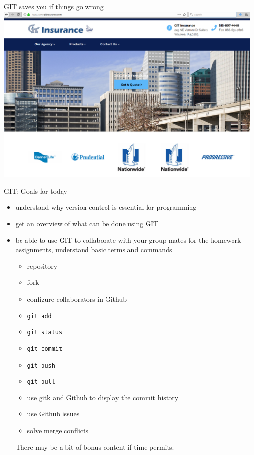 \begin{frame}[fragile]{GIT saves you if things go wrong}
    \includegraphics[width=\textwidth]{images/git-insurance.png}
\end{frame}


\begin{frame}[fragile]{GIT: Goals for today}
    \begin{itemize}
        \item understand why version control is essential for programming\pause
        \item get an overview of what can be done using GIT\pause
        \item be able to use GIT to collaborate with your group mates for the homework
            assignments, understand basic terms and commands\pause
        \begin{itemize}
            \item repository
            \item fork
            \item configure collaborators in Github
            \item \verb|git add|
            \item \verb|git status|
            \item \verb|git commit|
            \item \verb|git push|
            \item \verb|git pull|
            \item use gitk and Github to display the commit history
            \item use Github issues
            \item solve merge conflicts
        \end{itemize}

        \pause
        There may be a bit of bonus content if time permits.
    \end{itemize}
\end{frame}



